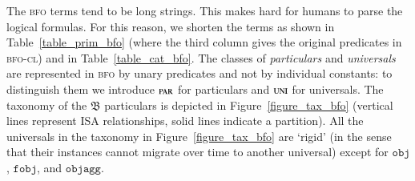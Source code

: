 \documentclass[ao]{iosart2x}
\newcommand{\nb}[1]{\textcolor{red}{$|$}\marginpar{\hspace*{-0cm}\parbox{20mm}{\scriptsize\raggedright\textcolor{red}{#1}}}}
\newcommand{\bfoAxLabel}{\textrm{a$_\texttt{b}$}}
\newcommand{\bfoDefLabel}{\textrm{d$_\texttt{b}$}}
\newcommand{\refbfoax}[1]{({\bfoAxLabel}\ref{#1})}
\newcommand{\refbfodf}[1]{({\bfoDefLabel}\ref{#1})}
\newcommand{\cn}[1]{\mathtt{#1}}
\newcommand{\bfo}{{\textsc{bfo}}}
\newcommand{\bfocl}{{\textsc{bfo-cl}}}
\newcommand {\thbfo} {\ensuremath{\mathfrak{B}}}
\newcommand{\objbcat}{\cn{obj}}
\newcommand{\fobjbcat}{\cn{fobj}}
\newcommand{\objaggbcat}{\cn{objagg}}
\newcommand{\bfopartic}{\textsc{par}}
\newcommand{\bfouniv}{\textsc{uni}}
\begin{document}
The {\bfo} terms tend to be long strings. This makes hard for humans to parse the logical formulas. For this reason, we shorten the terms as shown in Table~\ref{table_prim_bfo} (where the third column gives the original predicates in {\bfocl}) and in Table~\ref{table_cat_bfo}. 
The classes of \emph{particulars} and \emph{universals} are represented in {\bfo} by unary predicates and not by individual constants: to distinguish them we introduce $\bfopartic$ for particulars and $\bfouniv$ for universals. %
The taxonomy of the $\thbfo$ particulars is depicted in Figure~\ref{figure_tax_bfo} (vertical lines represent ISA relationships, solid lines indicate a partition). All the universals in the taxonomy in Figure~\ref{figure_tax_bfo} are `rigid' (in the sense that their instances cannot migrate over time to another universal) except for $\objbcat$, $\fobjbcat$, and $\objaggbcat$. %




\end{document}
